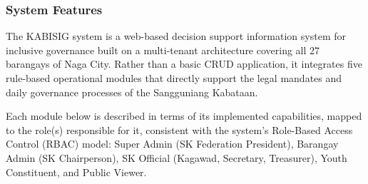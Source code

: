 \subsubsection{System Features}
\label{subsubsec:system_features}

\hspace*{\parindent}The KABISIG system is a web-based decision support information system for inclusive governance built on a multi-tenant architecture covering all 27 barangays of Naga City. Rather than a basic CRUD application, it integrates five rule-based operational modules that directly support the legal mandates and daily governance processes of the Sangguniang Kabataan.

Each module below is described in terms of its implemented capabilities, mapped to the role(s) responsible for it, consistent with the system's Role-Based Access Control (RBAC) model: Super Admin (SK Federation President), Barangay Admin (SK Chairperson), SK Official (Kagawad, Secretary, Treasurer), Youth Constituent, and Public Viewer.

